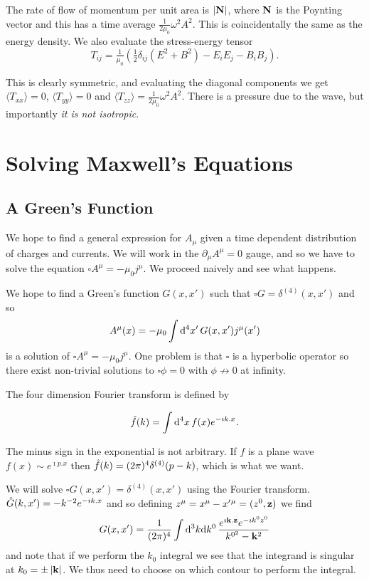 \documentclass{notes}
\renewcommand{\Box}{\square}
\begin{document}
The rate of flow of momentum per unit area is $\left|\mathbf{N}\right|$, where
$\mathbf{N}$ is the Poynting vector and this has a time average
$\tfrac{1}{2 \mu_0} \omega^2 A^2$.  This is coincidentally the same as the
energy density.  We also evaluate the stress-energy tensor
\[
T_{i j} = \tfrac{1}{\mu_0} \left( \tfrac{1}{2} \delta_{i j} \left(E^2
+B^2 \right) - E_i E_j - B_i B_j\right).
\]

This is clearly symmetric, and evaluating the diagonal components we get
$\langle T_{xx} \rangle = 0$, $\langle T_{yy} \rangle = 0$ and
$\langle T_{zz} \rangle = \tfrac{1}{2 \mu_0} \omega^2 A^2$.  There is
a pressure due to the wave, but importantly \emph{it is not isotropic}.

\chapter{Solving Maxwell's Equations}

\section{A Green's Function}

We hope to find a general expression for $A_\mu$ given a
time dependent distribution of charges and currents.  We will work
in the $\partial_\mu A^\mu = 0$ gauge, and so we have to
solve the equation $\Box A^\mu = - \mu_0 j^\mu$.  We proceed naively
and see what happens.

We hope to find a Green's function $G(x,x')$ such that
$\Box G = \delta^{(4)} (x,x')$ and so
\[
A^\mu(x) = - \mu_0 \int \mathrm{d}^4 x'\, G(x,x') j^\mu(x')
\]
is a solution of $\Box A^\mu = - \mu_0 j^\mu$.  One problem is
that $\Box$ is a hyperbolic operator so there exist non-trivial solutions
to $\Box \phi = 0$ with $\phi \not \to 0$ at infinity.

The four dimension Fourier transform is defined by

\[
\Hat{f}(k) = \int \mathrm{d}^4 x\, f(x) e^{-\imath k.x}.
\]

The minus sign in the exponential is not arbitrary.  If $f$ is a plane
wave $f(x) \sim e^{\imath p.x}$ then
$\Hat{f}(k) = (2 \pi)^4 \delta^{(4)}(p-k)$, which is what we want.

We will solve $\Box G(x,x') = \delta^{(4)}(x,x')$ using the Fourier
transform.  $\Hat{G}(k,x') = - k^{-2} e^{- \imath k.x}$ and so defining
$z^\mu = x^\mu - x'{}^\mu = (z^0,\mathbf{z})$ we find
\[
G(x,x') = \frac{1}{(2 \pi)^4} \int \mathrm{d}^3 k\mathrm{d} k^0\,
\frac{e^{\imath \mathbf{k}.\mathbf{z}} e^{- \imath k^0 z^0}}{k^{0^2} -\mathbf{k}^2}
\]
and note that if we perform the $k_0$ integral we see that the integrand
is singular at $k_0 = \pm \left|\mathbf{k}\right|$.  We thus need
to choose on which contour to perform the integral.
\end{document}
